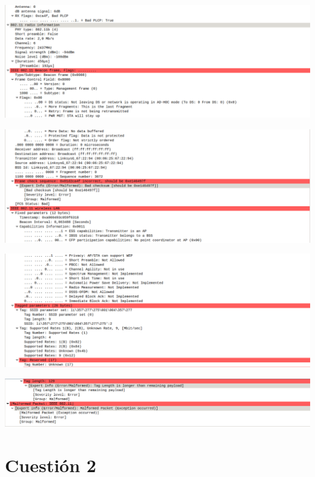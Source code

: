 \documentclass{article}
\begin{document}
\begin{center}
\includegraphics[scale=0.3]{WLAN/inco4.png}
\end{center}
\begin{center}
\includegraphics[scale=0.3]{WLAN/inco5.png}
\end{center}
\begin{center}
\includegraphics[scale=0.3]{WLAN/inco6.png}
\end{center}
\begin{center}
\includegraphics[scale=0.3]{WLAN/inco7.png}
\end{center}

\section{Cuestión 2}
\end{document}
